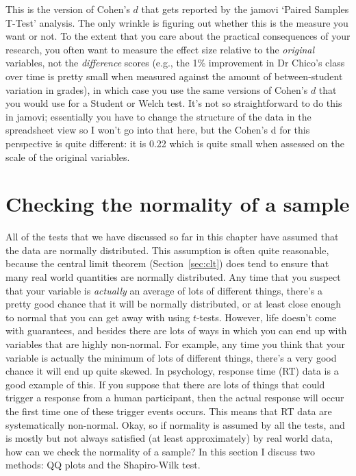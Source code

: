 This is the version of Cohen's $d$ that gets reported by the jamovi `Paired Samples T-Test' analysis. The only wrinkle is figuring out whether this is the measure you want or not. To the extent that you care about the practical consequences of your research, you often want to measure the effect size relative to the {\it original} variables, not the {\it difference} scores (e.g., the 1\% improvement in Dr Chico's class over time is pretty small when measured against the amount of between-student variation in grades), in which case you use the same versions of Cohen's $d$ that you would use for a Student or Welch test. It's not so straightforward to do this in jamovi; essentially you have to change the structure of the data in the spreadsheet view so I won't go into that here, but the Cohen's d for this perspective is quite different: it is 0.22 which is quite small when assessed on the scale of the original variables.


\section{Checking the normality of a sample\label{sec:shapiro}}

All of the tests that we have discussed so far in this chapter have assumed that the data are normally distributed. This assumption is often quite reasonable, because the central limit theorem (Section~\ref{sec:clt}) does tend to ensure that many real world quantities are normally distributed. Any time that you suspect that your variable is {\it actually} an average of lots of different things, there's a pretty good chance that it will be normally distributed, or at least close enough to normal that you can get away with using $t$-tests. However, life doesn't come with guarantees, and besides there are lots of ways in which you can end up with variables that are highly non-normal. For example, any time you think that your variable is actually the minimum of lots of different things, there's a very good chance it will end up quite skewed. In psychology, response time (RT) data is a good example of this. If you suppose that there are lots of things that could trigger a response from a human participant, then the actual response will occur the first time one of these trigger events occurs. This means that RT data are systematically non-normal.  Okay, so if normality is assumed by all the tests, and is mostly but not always satisfied (at least approximately) by real world data, how can we check the normality of a sample? In this section I discuss two methods: QQ plots and the Shapiro-Wilk test.

